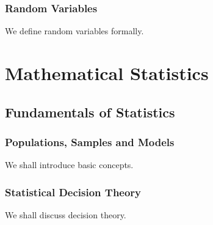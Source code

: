 \documentclass[thmcnt=section, 12pt]{elegantbook}
\begin{document}
\section{Random Variables}

\par We define random variables formally.








\part{Mathematical Statistics}





\chapter{Fundamentals of Statistics}


\section{Populations, Samples and Models}

\par We shall introduce basic concepts.


\section{Statistical Decision Theory}

\par We shall discuss decision theory.


\printindex

\end{document}
